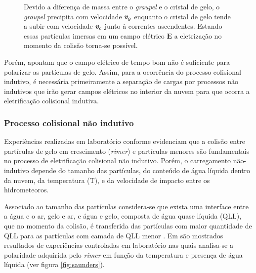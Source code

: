 \begin{figure}[htp]
   \centering
   \caption{Devido a diferença de massa entre o \textit{graupel} e o cristal de gelo, o \textit{graupel} precipita com velocidade $\textit{\textbf{v}}_g$ enquanto o cristal de gelo tende a subir com velocidade $\textit{\textbf{v}}_c$ junto à correntes ascendentes. Estando essas partículas imersas em um campo elétrico $\textbf{E}$ a eletrização no momento da colisão torna-se possível.}
   \label{fig:ind}
\end{figure}


Porém,  apontam que o campo elétrico de tempo bom não é suficiente para polarizar as partículas de gelo. Assim, para a ocorrência do processo colisional indutivo, é necessária primeiramente a separação de cargas por processos não indutivos que irão gerar campos elétricos no interior da nuvem para que ocorra a eletrificação colisional indutiva.


\subsubsection{Processo colisional não indutivo}

Experiências realizadas em laboratório conforme  evidenciam que a colisão entre partículas de gelo em crescimento (\textit{rimer}) e partículas menores são fundamentais no processo de eletrificação colisional não indutivo. Porém, o carregamento não-indutivo depende do tamanho das partículas, do conteúdo de água líquida dentro da nuvem, da temperatura (T), e da velocidade de impacto entre os hidrometeoros.

Associado ao tamanho das partículas considera-se que exista uma interface entre a água e o ar, gelo e ar, e água e gelo, composta de água quase líquida (QLL), que no momento da colisão, é transferida das partículas com maior quantidade de QLL para as partículas com camada de QLL menor \cite[apud \cite{rachel}]{baker1994}.
Em  são mostrados resultados de experiências controladas em laboratório nas quais analisa-se a polaridade adquirida pelo \textit{rimer} em função da temperatura e presença de água líquida (ver figura \ref{fig:saunders}). 

